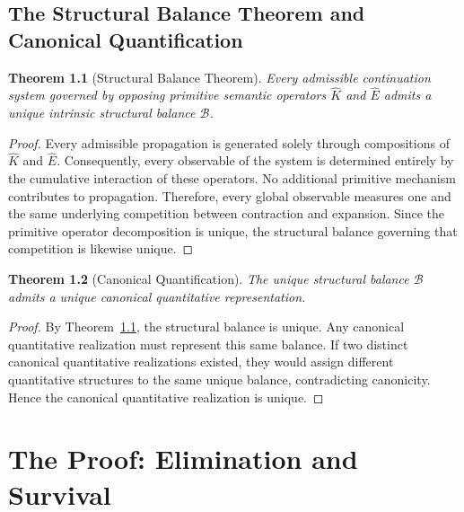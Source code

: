 \documentclass[12pt,anyside]{book}
\theoremstyle{plain}
\newtheorem{theorem}{Theorem}[chapter]
\theoremstyle{definition}
\newcommand{\Ehat}{\hat{E}}            %
\begin{document}
\chapter{The Structural Balance Theorem and Canonical Quantification}

\begin{theorem}[Structural Balance Theorem]\label{thm:balance}
Every admissible continuation system governed by opposing primitive semantic operators $\hat{K}$ and $\Ehat$ admits a unique intrinsic structural balance $\mathcal{B}$.
\end{theorem}

\begin{proof}
Every admissible propagation is generated solely through compositions of $\hat{K}$ and $\Ehat$. Consequently, every observable of the system is determined entirely by the cumulative interaction of these operators. No additional primitive mechanism contributes to propagation. Therefore, every global observable measures one and the same underlying competition between contraction and expansion. Since the primitive operator decomposition is unique, the structural balance governing that competition is likewise unique.
\end{proof}

\begin{theorem}[Canonical Quantification]\label{thm:quant}
The unique structural balance $\mathcal{B}$ admits a unique canonical quantitative representation.
\end{theorem}

\begin{proof}
By Theorem~\ref{thm:balance}, the structural balance is unique. Any canonical quantitative realization must represent this same balance. If two distinct canonical quantitative realizations existed, they would assign different quantitative structures to the same unique balance, contradicting canonicity. Hence the canonical quantitative realization is unique.
\end{proof}

\part{The Proof: Elimination and Survival}
\end{document}
